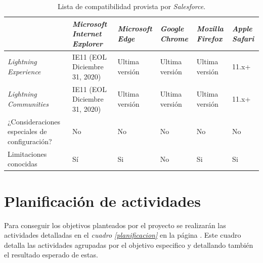 \begin{table}
\centering
\begin{tabular}{|p{6.0cm}|p{2.5cm}|p{1.4cm}|p{1.3cm}|p{1.3cm}|p{1.0cm}|}
\hline
& \footnotesize{\textbf{\emph{Microsoft Internet Explorer}}}
& \footnotesize{\textbf{\emph{Microsoft Edge}}}
& \footnotesize{\textbf{\emph{Google Chrome}}}
& \footnotesize{\textbf{\emph{Mozilla Firefox}}}
& \footnotesize{\textbf{\emph{Apple Safari}}} \\
\hline
\footnotesize{\emph{Lightning Experience}}
& \footnotesize{IE11 (EOL Diciembre 31, 2020)}
& \footnotesize{Ultima versión}
& \footnotesize{Ultima versión}
& \footnotesize{Ultima versión}
& \footnotesize{11.x+} \\
\footnotesize{\emph{Lightning Communities}}
& \footnotesize{IE11 (EOL Diciembre 31, 2020)}
& \footnotesize{Ultima versión}
& \footnotesize{Ultima versión}
& \footnotesize{Ultima versión}
& \footnotesize{11.x+} \\
\footnotesize{¿Consideraciones especiales de configuración?}
& \footnotesize{No}
& \footnotesize{No}
& \footnotesize{No}
& \footnotesize{No}
& \footnotesize{No} \\
\footnotesize{Limitaciones conocidas}
& \footnotesize{Sí}
& \footnotesize{Si}
& \footnotesize{No}
& \footnotesize{Si}
& \footnotesize{Si} \\
\hline
\end{tabular}
\caption{Lista de compatibilidad provista por \emph{Salesforce}.}
\label{soporte_navegadores}
\end{table}

\section{Planificación de actividades}
Para conseguir los objetivos planteados por el proyecto se realizarán las
actividades detalladas en el \emph{cuadro \ref{planificacion}} en la página
\pageref{planificacion}. Este cuadro detalla las actividades agrupadas por el
objetivo especifico y detallando también el resultado esperado de estas.

